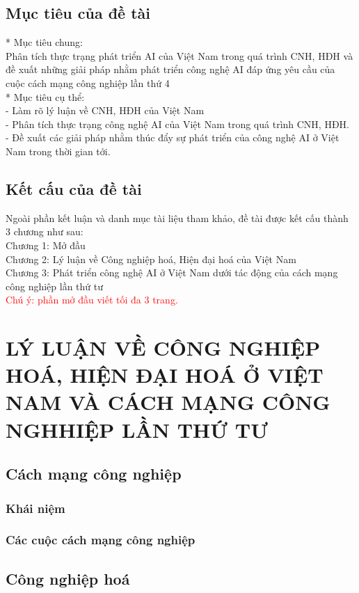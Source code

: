\documentclass{report}
\newcommand{\gachdau}{\hspace*{1.5em}\ignorespaces} %
\begin{document}
\section{Mục tiêu của đề tài}
\gachdau
* Mục tiêu chung:\\
\gachdau
Phân tích thực trạng phát triển AI của Việt Nam trong quá trình CNH, HĐH và đề xuất những giải pháp nhằm phát triển công nghệ AI đáp ứng yêu cầu của cuộc cách mạng công nghiệp lần thứ 4\\
\gachdau
* Mục tiêu cụ thể:\\
\gachdau
- Làm rõ lý luận về CNH, HĐH của Việt Nam\\
\gachdau
- Phân tích thực trạng công nghệ AI của Việt Nam trong quá trình CNH, HĐH.\\
\gachdau
- Đề xuất các giải pháp nhằm thúc đẩy sự phát triển của công nghệ AI ở Việt Nam trong thời gian tới.
\section{Kết cấu của đề tài}
\gachdau
Ngoài phần kết luận và danh mục tài liệu tham khảo, đề tài được kết cấu thành  3 chương như sau:\\
\gachdau
Chương 1: Mở đầu\\
\gachdau
Chương 2: Lý luận về Công nghiệp hoá, Hiện đại hoá của Việt Nam\\
\gachdau
Chương 3: Phát triển công nghệ AI ở Việt Nam dưới tác động của cách mạng công nghiệp lần thứ tư\\

\textcolor{red}{Chú ý: phần mở đầu viết tối đa 3 trang.}

\chapter{LÝ LUẬN VỀ CÔNG NGHIỆP HOÁ, HIỆN ĐẠI HOÁ Ở VIỆT NAM VÀ CÁCH MẠNG CÔNG NGHHIỆP LẦN THỨ TƯ}

\section{Cách mạng công nghiệp}
\subsection{Khái niệm}
\subsection{Các cuộc cách mạng công nghiệp}
\section{Công nghiệp hoá}
\end{document}
